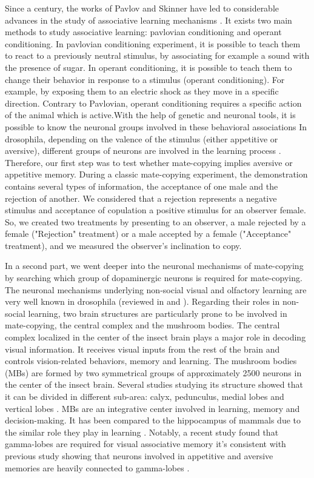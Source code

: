\documentclass[a4paper, 12pt]{article}
\begin{document}
Since a century, the works of Pavlov and Skinner have led to considerable advances in the study of associative learning mechanisms \parencite{pavlov_conditioned_1927, iversen_skinners_1992}. It exists two main methods to study associative learning: pavlovian conditioning and operant conditioning. In pavlovian conditioning experiment, it is possible to teach them to react to a previously neutral stimulus, by associating for example a sound with the presence of sugar. In operant conditioning, it is possible to teach them to change their behavior in response to a stimulus (operant conditioning). For example, by exposing them to an electric shock as they move in a specific direction. Contrary to Pavlovian, operant conditioning requires a specific action of the animal which is active.With the help of genetic and neuronal tools, it is possible to know the neuronal groups involved  in these behavioral associations In drosophila, depending on the valence of the stimulus (either appetitive or aversive), different groups of neurons are involved in the learning process \parencite{vogt_shared_2014, busto_olfactory_2010}. Therefore, our first step was to test whether mate-copying implies aversive or appetitive memory. During a classic mate-copying experiment, the demonstration contains several types of information, the acceptance of one male and the rejection of another. We considered that a rejection represents a negative stimulus and acceptance of copulation a positive stimulus for an observer female. So, we created two treatments by presenting to an observer, a male rejected by a female ("Rejection" treatment) or a male accepted by a female ("Acceptance" treatment), and we measured the observer’s inclination to copy. 
	
In a second part, we went deeper into the neuronal mechanisms of mate-copying by searching which group of dopaminergic neurons is required for mate-copying. The neuronal mechanisms underlying non-social visual and olfactory learning are very well known in drosophila (reviewed in \textcite{ guo_vision_2017} and \textcite{cognigni_right_2018}). Regarding their roles in non-social learning, two brain structures are particularly prone to be involved in mate-copying, the central complex and the mushroom bodies. The central complex localized in the center of the insect brain plays a major role in decoding visual information. It receives visual inputs from the rest of the brain and controls vision-related behaviors, memory and learning. The mushroom bodies (MBs) are formed by two symmetrical groups of approximately 2500 neurons in the center of the insect brain. Several studies studying its structure showed that it can be divided in different sub-area: calyx, pedunculus, medial lobes and vertical lobes \parencite{aso_neuronal_2014}. MBs are an integrative center involved in learning, memory and decision-making. It has been compared to the hippocampus of mammals due to the similar role they play in learning \parencite{strausfeld_evolution_1998}.	Notably, a recent study found that gamma-lobes are required for visual associative memory \parencite{ vogt_shared_2014} it's consistent with previous study showing that neurons involved in appetitive and aversive memories are heavily connected to gamma-lobes \parencite{claridge-chang_writing_2009, burke_layered_2012}.
	
\end{document}
